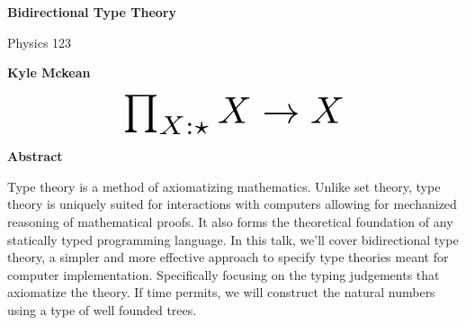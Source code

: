 \documentclass{article}
\begin{document}
\thispagestyle{plain}
\begin{center}
    \Large
    \textbf{Bidirectional Type Theory}
    
    \vspace{0.4cm}
    \large
    Physics 123
    
    \vspace{0.4cm}
    \textbf{Kyle Mckean}


    \begin{equation*}
      \scalebox{3}{
        $\prod_{X : \star} X \rightarrow X$
      }
    \end{equation*}
    
    \vspace{0.4cm}
    \textbf{Abstract}
\end{center}
Type theory is a method of axiomatizing mathematics. Unlike set theory, type
theory is uniquely suited for interactions with computers allowing
for mechanized reasoning of mathematical proofs. It also forms the theoretical foundation
of any statically typed programming language. In this talk, we'll cover
bidirectional type theory, a simpler and more effective approach to specify type
theories meant for computer implementation. Specifically focusing on the typing
judgements that axiomatize the theory. If time permits, we will construct
the natural numbers using a type of well founded trees.
\end{document}
